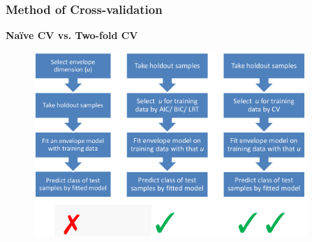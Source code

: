 \documentclass[handout,10pt]{beamer}
\newcommand{\colubf}{\color{UniBlue} \bf}
\begin{document}
\begin{frame}
\frametitle{Method of Cross-validation}
\begin{center}\begin{large}
{\colubf Na\"{i}ve CV vs. Two-fold CV}
\end{large}\end{center}
\begin{figure}\begin{center}
   \includegraphics[height=7cm]{cv.png}
   \label{fig:fig1}
\end{center}\end{figure}
\end{frame}
\end{document}
